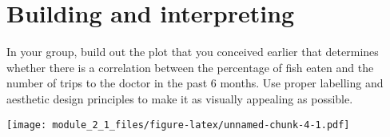 \documentclass[
]{article}
\newenvironment{Shaded}{\begin{snugshade}}{\end{snugshade}}
\newcommand{\AttributeTok}[1]{\textcolor[rgb]{0.77,0.63,0.00}{#1}}
\newcommand{\ConstantTok}[1]{\textcolor[rgb]{0.00,0.00,0.00}{#1}}
\newcommand{\DecValTok}[1]{\textcolor[rgb]{0.00,0.00,0.81}{#1}}
\newcommand{\FunctionTok}[1]{\textcolor[rgb]{0.00,0.00,0.00}{#1}}
\newcommand{\NormalTok}[1]{#1}
\newcommand{\SpecialCharTok}[1]{\textcolor[rgb]{0.00,0.00,0.00}{#1}}
\newcommand{\StringTok}[1]{\textcolor[rgb]{0.31,0.60,0.02}{#1}}
\begin{document}
\hypertarget{building-and-interpreting}{%
\section{Building and interpreting}\label{building-and-interpreting}}

In your group, build out the plot that you conceived earlier that
determines whether there is a correlation between the percentage of fish
eaten and the number of trips to the doctor in the past 6 months. Use
proper labelling and aesthetic design principles to make it as visually
appealing as possible.

\begin{Shaded}
\end{Shaded}

\texttt{[image: module\_2\_1\_files/figure-latex/unnamed-chunk-4-1.pdf]}
\end{document}
